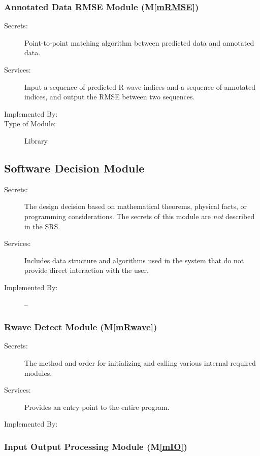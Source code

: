 \documentclass[12pt, titlepage]{article}
\newcommand{\mref}[1]{M\ref{#1}}
\begin{document}
\subsubsection{Annotated Data RMSE Module (\mref{mRMSE})}

\begin{description}
\item[Secrets:]Point-to-point matching algorithm between predicted data and
annotated data.
\item[Services:]Input a sequence of predicted R-wave indices and a sequence of
annotated indices, and output the RMSE between two sequences.
\item[Implemented By:] \progname
\item[Type of Module:] Library
\end{description}


\subsection{Software Decision Module}

\begin{description}
\item[Secrets:] The design decision based on mathematical theorems, physical
  facts, or programming considerations. The secrets of this module are
  \emph{not} described in the SRS.
\item[Services:] Includes data structure and algorithms used in the system that
  do not provide direct interaction with the user. 
\item[Implemented By:] --
\end{description}

\subsubsection{Rwave Detect Module (\mref{mRwave})}

\begin{description}
\item[Secrets:]The method and order for initializing and calling various
internal required modules.
\item[Services:]Provides an entry point to the entire program.
\item[Implemented By:] \progname
\end{description}

\subsubsection{Input Output Processing Module (\mref{mIO})}
\end{document}
